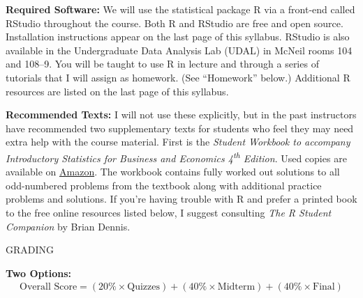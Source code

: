 \documentclass[11pt, letterpaper]{article}
\begin{document}
\noindent \textbf{Required Software:} 
We will use the statistical package R via a front-end called RStudio throughout the course. 
Both R and RStudio are free and open source. Installation instructions appear on the last page of this syllabus.
RStudio is also available in the Undergraduate Data Analysis Lab (UDAL) in McNeil rooms 104 and 108--9. 
You will be taught to use R in lecture and through a series of tutorials that I will assign as homework. (See ``Homework'' below.)  
Additional R resources are listed on the last page of this syllabus.

\medskip

\noindent \textbf{Recommended Texts:} 
I will not use these explicitly, but in the past instructors have recommended two
supplementary texts for students who feel they may need extra help with the course material. First is the \emph{Student Workbook to accompany Introductory Statistics for Business and Economics 4\textsuperscript{th} Edition}. 
Used copies are available on \href{http://www.amazon.com/gp/offer-listing/0471508993/sr=/qid=/ref=olp_page_2?ie=UTF8&colid=&coliid=&condition=all&me=&qid=&shipPromoFilter=0&sort=sip&sr=&startIndex=10}{Amazon}. 
The workbook contains fully worked out solutions to all odd-numbered problems from the textbook along with additional practice problems and solutions.
If you're having trouble with R and prefer a printed book to the free online resources listed below, I suggest consulting \emph{The R Student Companion} by Brian Dennis.


\newpage




\begin{center}
\small
GRADING
\end{center}

\noindent \textbf{Two Options:}
	\begin{equation*}
	\begin{split}
		\mbox{Overall Score} = (20\% \times \mbox{Quizzes})  + (40\% \times \mbox{Midterm}) + (40\% \times \mbox{Final})
	\end{split}
	\end{equation*}
\end{document}
